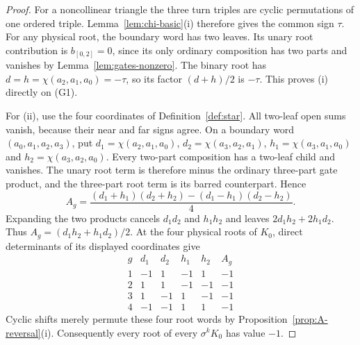 \begin{proof}
For a noncollinear triangle the three turn triples are cyclic
permutations of one ordered triple. Lemma~\ref{lem:chi-basic}(i)
therefore gives the common sign $\tau$. For any physical root,
the boundary word has two leaves. Its unary root contribution is
$b_{[0,2]}=0$, since its only ordinary composition has two parts
and vanishes by Lemma~\ref{lem:gates-nonzero}. The binary root
has $d=h=\chi(a_2,a_1,a_0)=-\tau$, so its factor
$(d+h)/2$ is $-\tau$. This proves (i) directly on (G1).

For (ii), use the four coordinates of Definition~\ref{def:star}.
All two-leaf open sums vanish, because their near
and far signs agree. On a boundary word $(a_0,a_1,a_2,a_3)$, put
$d_1=\chi(a_2,a_1,a_0)$, $d_2=\chi(a_3,a_2,a_1)$,
$h_1=\chi(a_3,a_1,a_0)$ and $h_2=\chi(a_3,a_2,a_0)$.
Every two-part composition has a two-leaf child and vanishes.
The unary root term is therefore minus the ordinary three-part gate
product, and the three-part root term is its barred counterpart. Hence
\begin{equation}\label{eq:root-bowtie-recursion}
A_g=\frac{(d_1+h_1)(d_2+h_2)-(d_1-h_1)(d_2-h_2)}4.
\end{equation}
Expanding the two products cancels $d_1d_2$ and $h_1h_2$ and leaves
$2d_1h_2+2h_1d_2$. Thus $A_g=(d_1h_2+h_1d_2)/2$.
At the four physical roots of $K_0$, direct determinants of its displayed
coordinates give
\begin{equation}\label{eq:root-bowtie-signs}
\begin{array}{c|rrrr|r}
g&d_1&d_2&h_1&h_2&A_g\\\hline
1&-1&1&-1&1&-1\\
2&1&1&-1&-1&-1\\
3&1&-1&1&-1&-1\\
4&-1&-1&1&1&-1
\end{array}
\end{equation}
Cyclic shifts merely permute these four root words by
Proposition~\ref{prop:A-reversal}(i). Consequently every root of every
$\sigma^kK_0$ has value $-1$.
\end{proof}

